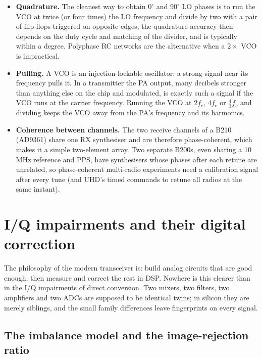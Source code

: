 \begin{itemize}
\item \textbf{Quadrature.} The cleanest way to obtain $0^\circ$ and $90^\circ$ LO phases is to run the VCO
at twice (or four times) the LO frequency and divide by two with a pair of flip-flops triggered on
opposite edges; the quadrature accuracy then depends on the duty cycle and matching of the divider, and
is typically within a degree. Polyphase RC networks are the alternative when a $2\times$ VCO is
impractical.
\item \textbf{Pulling.} A VCO is an injection-lockable oscillator: a strong signal near its frequency
pulls it. In a transmitter the PA output, many decibels stronger than anything else on the chip and
modulated, is exactly such a signal if the VCO runs at the carrier frequency. Running the VCO at
$2f_c$, $4f_c$ or $\tfrac43f_c$ and dividing keeps the VCO away from the PA's frequency and its harmonics.
\item \textbf{Coherence between channels.} The two receive channels of a B210 (AD9361) share one RX
synthesiser and are therefore phase-coherent, which makes it a simple two-element array. Two separate
B200s, even sharing a 10\,MHz reference and PPS, have synthesisers whose phases after each retune are
unrelated, so phase-coherent multi-radio experiments need a calibration signal after every tune (and
UHD's timed commands to retune all radios at the same instant).
\end{itemize}

\section{I/Q impairments and their digital correction}
\label{sec:ch07:iq}

The philosophy of the modern transceiver is: build analog circuits that are good enough, then
measure and correct the rest in DSP. Nowhere is this clearer than in the I/Q impairments of
direct conversion. Two mixers, two filters, two amplifiers and two ADCs are supposed to be identical
twins; in silicon they are merely siblings, and the small family differences leave fingerprints on
every signal.

\subsection{The imbalance model and the image-rejection ratio}

